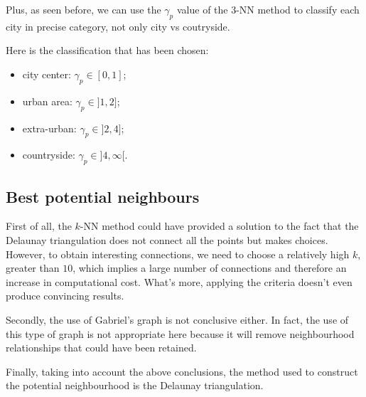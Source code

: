 \documentclass[lettersize,journal,english]{IEEEtran}
\begin{document}
        Plus, as seen before, we can use the $\gamma_p$ value of the $3$-NN method to classify each city in precise category, not only city vs coutryside. 

        Here is the classification that has been chosen: 
        \begin{itemize}
            \item city center: $\gamma_p\in [0,1]$;
            \item urban area: $\gamma_p\in ]1,2]$;
            \item extra-urban: $\gamma_p\in ]2,4]$;
            \item countryside: $\gamma_p\in ]4,\infty[$.
        \end{itemize}

    \subsection{Best potential neighbours}
        First of all, the $k$-NN method could have provided a solution to the fact that the Delaunay triangulation does not connect all the points but makes choices. However, to obtain interesting connections, we need to choose a relatively high $k$, greater than $10$, which implies a large number of connections and therefore an increase in   computational cost. What's more, applying the criteria doesn't even produce convincing results.
        
        Secondly, the use of Gabriel's graph is not conclusive either. In fact, the use of this type of graph is not appropriate here because it will remove neighbourhood relationships that could have been retained.

        Finally, taking into account the above conclusions, the method used to construct the potential neighbourhood is the Delaunay triangulation.
\end{document}
